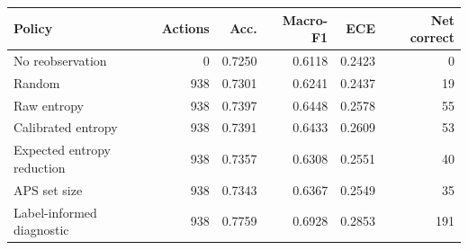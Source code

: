 \begin{tabular}{lrrrrr}
\toprule
Policy & Actions & Acc. & Macro-F1 & ECE & Net correct \\
\midrule
No reobservation & 0 & 0.7250 & 0.6118 & 0.2423 & 0 \\
Random & 938 & 0.7301 & 0.6241 & 0.2437 & 19 \\
Raw entropy & 938 & 0.7397 & 0.6448 & 0.2578 & 55 \\
Calibrated entropy & 938 & 0.7391 & 0.6433 & 0.2609 & 53 \\
Expected entropy reduction & 938 & 0.7357 & 0.6308 & 0.2551 & 40 \\
APS set size & 938 & 0.7343 & 0.6367 & 0.2549 & 35 \\
Label-informed diagnostic & 938 & 0.7759 & 0.6928 & 0.2853 & 191 \\
\bottomrule
\end{tabular}
